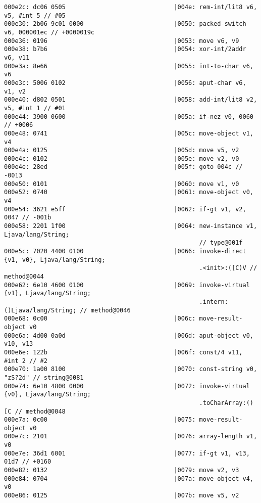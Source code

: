 \begin{lstlisting}
000e2c: dc06 0505                              |004e: rem-int/lit8 v6, v5, #int 5 // #05
000e30: 2b06 9c01 0000                         |0050: packed-switch v6, 000001ec // +0000019c
000e36: 0196                                   |0053: move v6, v9
000e38: b7b6                                   |0054: xor-int/2addr v6, v11
000e3a: 8e66                                   |0055: int-to-char v6, v6
000e3c: 5006 0102                              |0056: aput-char v6, v1, v2
000e40: d802 0501                              |0058: add-int/lit8 v2, v5, #int 1 // #01
000e44: 3900 0600                              |005a: if-nez v0, 0060 // +0006
000e48: 0741                                   |005c: move-object v1, v4
000e4a: 0125                                   |005d: move v5, v2
000e4c: 0102                                   |005e: move v2, v0
000e4e: 28ed                                   |005f: goto 004c // -0013
000e50: 0101                                   |0060: move v1, v0
000e52: 0740                                   |0061: move-object v0, v4
000e54: 3621 e5ff                              |0062: if-gt v1, v2, 0047 // -001b
000e58: 2201 1f00                              |0064: new-instance v1, Ljava/lang/String;
                                                      // type@001f
000e5c: 7020 4400 0100                         |0066: invoke-direct {v1, v0}, Ljava/lang/String;
                                                      .<init>:([C)V // method@0044
000e62: 6e10 4600 0100                         |0069: invoke-virtual {v1}, Ljava/lang/String;
                                                      .intern:()Ljava/lang/String; // method@0046
000e68: 0c00                                   |006c: move-result-object v0
000e6a: 4d00 0a0d                              |006d: aput-object v0, v10, v13
000e6e: 122b                                   |006f: const/4 v11, #int 2 // #2
000e70: 1a00 8100                              |0070: const-string v0, "zS?2d" // string@0081
000e74: 6e10 4800 0000                         |0072: invoke-virtual {v0}, Ljava/lang/String;
                                                      .toCharArray:()[C // method@0048
000e7a: 0c00                                   |0075: move-result-object v0
000e7c: 2101                                   |0076: array-length v1, v0
000e7e: 36d1 6001                              |0077: if-gt v1, v13, 01d7 // +0160
000e82: 0132                                   |0079: move v2, v3
000e84: 0704                                   |007a: move-object v4, v0
000e86: 0125                                   |007b: move v5, v2

\end{lstlisting}
